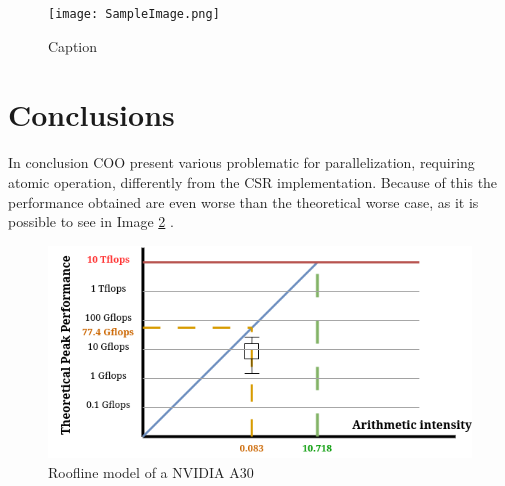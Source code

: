 \documentclass[conference]{IEEEtran}
\begin{document}
\begin{figure}[hbt!]
    \centering
    \texttt{[image: SampleImage.png]}
    \caption{Caption}
    \label{fig:enter-label}
\end{figure}

\FloatBarrier
\section{Conclusions}
In conclusion COO present various problematic for parallelization, requiring atomic operation, differently from the CSR implementation. Because of this the performance obtained are even worse than the theoretical worse case, as it is possible to see in Image \ref{fig:roofline} .

\begin{figure}[hbt!]
	\centering
	\includegraphics[width=1\linewidth]{data_images/roofline}
	\caption{Roofline model of a NVIDIA A30}
	\label{fig:roofline}
\end{figure}







\end{document}
